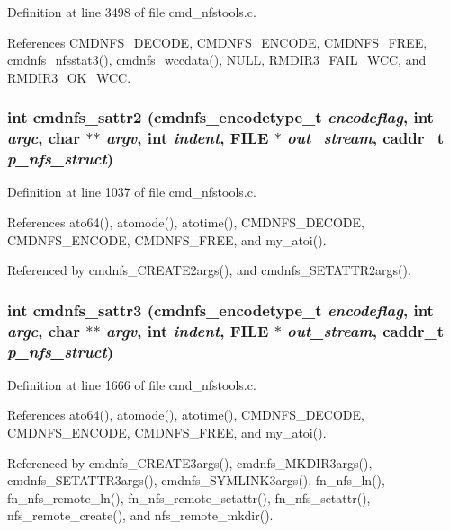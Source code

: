Definition at line 3498 of file cmd\_\-nfstools.c.

References CMDNFS\_\-DECODE, CMDNFS\_\-ENCODE, CMDNFS\_\-FREE, cmdnfs\_\-nfsstat3(), cmdnfs\_\-wccdata(), NULL, RMDIR3\_\-FAIL\_\-WCC, and RMDIR3\_\-OK\_\-WCC.
\subsubsection{\setlength{\rightskip}{0pt plus 5cm}int cmdnfs\_\-sattr2 ({\bf cmdnfs\_\-encodetype\_\-t} {\em encodeflag}, int {\em argc}, char $\ast$$\ast$ {\em argv}, int {\em indent}, FILE $\ast$ {\em out\_\-stream}, caddr\_\-t {\em p\_\-nfs\_\-struct})}\label{cmd__nfstools_8h_a29}




Definition at line 1037 of file cmd\_\-nfstools.c.

References ato64(), atomode(), atotime(), CMDNFS\_\-DECODE, CMDNFS\_\-ENCODE, CMDNFS\_\-FREE, and my\_\-atoi().

Referenced by cmdnfs\_\-CREATE2args(), and cmdnfs\_\-SETATTR2args().
\subsubsection{\setlength{\rightskip}{0pt plus 5cm}int cmdnfs\_\-sattr3 ({\bf cmdnfs\_\-encodetype\_\-t} {\em encodeflag}, int {\em argc}, char $\ast$$\ast$ {\em argv}, int {\em indent}, FILE $\ast$ {\em out\_\-stream}, caddr\_\-t {\em p\_\-nfs\_\-struct})}\label{cmd__nfstools_8h_a36}




Definition at line 1666 of file cmd\_\-nfstools.c.

References ato64(), atomode(), atotime(), CMDNFS\_\-DECODE, CMDNFS\_\-ENCODE, CMDNFS\_\-FREE, and my\_\-atoi().

Referenced by cmdnfs\_\-CREATE3args(), cmdnfs\_\-MKDIR3args(), cmdnfs\_\-SETATTR3args(), cmdnfs\_\-SYMLINK3args(), fn\_\-nfs\_\-ln(), fn\_\-nfs\_\-remote\_\-ln(), fn\_\-nfs\_\-remote\_\-setattr(), fn\_\-nfs\_\-setattr(), nfs\_\-remote\_\-create(), and nfs\_\-remote\_\-mkdir().
